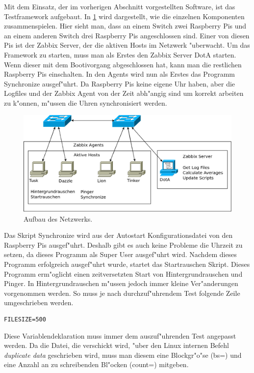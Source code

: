 Mit dem Einsatz, der im vorherigen Abschnitt vorgestellten Software, ist das Testframework aufgebaut. In \cref{fig:AufbauVomNetzwerk} %
wird dargestellt, wie die einzelnen Komponenten zusammenspielen. Hier sieht man, dass an einem Switch zwei Raspberry Pis %
und an einem anderen Switch drei Raspberry Pis angeschlossen sind. Einer von diesen Pis ist der Zabbix Server, der %
die aktiven Hosts im Netzwerk "uberwacht. Um das Framework zu starten, muss man als Erstes den Zabbix Server DotA starten. %
Wenn dieser mit dem Bootivorgang abgeschlossen hat, kann man die restlichen Raspberry Pis einschalten. %
In den Agents wird nun als Erstes das Programm Synchronize ausgef"uhrt. Da Raspberry Pis keine eigene Uhr haben, aber %
die Logfiles und der Zabbix Agent von der Zeit abh"angig sind um korrekt arbeiten zu k"onnen, m"ussen die Uhren synchronisiert werden. %
\label{sec:einsatzImNetzwerk}%
\begin{figure}[htbp]%
\centering%
\includegraphics*[width=0.9\linewidth]{Abb/Netzschaltung3}%
%
\caption{Aufbau des Netzwerks.}%
\label{fig:AufbauVomNetzwerk}%
\end{figure}%
Das Skript Synchronize wird aus der Autostart Konfigurationsdatei von den Raspberry Pis ausgef"uhrt. Deshalb gibt es auch keine %
Probleme die Uhrzeit zu setzen, da dieses Programm als Super User ausgef"uhrt wird. %
Nachdem dieses Programm erfolgreich ausgef"uhrt wurde, startet das Startrauschen Skript. %
Dieses Programm erm"oglicht einen zeitversetzten Start von Hintergrundrauschen und Pinger. %
In Hintergrundrauschen m"ussen jedoch immer kleine Ver"anderungen vorgenommen werden. %
So muss je nach durchzuf"uhrendem Test folgende Zeile umgeschrieben werden. %
\begin{verbatim}
FILESIZE=500
\end{verbatim}
Diese Variablendeklaration muss immer dem auszuf"uhrenden Test angepasst werden. %
Da die Datei, die verschickt wird, "uber den Linux internen Befehl \emph{duplicate data} geschrieben %
wird, muss man diesem eine Blockgr"o"se (bs=) und eine Anzahl an zu schreibenden Bl"ocken (count=) mitgeben. %
